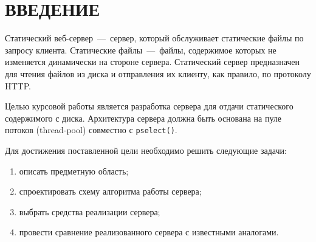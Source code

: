 \chapter*{ВВЕДЕНИЕ}

Статический веб-сервер~---~сервер, который обслуживает статические файлы по запросу клиента.
Статические файлы~---~файлы, содержимое которых не изменяется динамически на стороне сервера.
Статический сервер предназначен для чтения файлов из диска и отправления их клиенту, как правило, по протоколу HTTP.

Целью курсовой работы является разработка сервера для отдачи статического содержимого с диска.
Архитектура сервера должна быть основана на пуле потоков (thread-pool) совместно с \texttt{pselect()}.

Для достижения поставленной цели необходимо решить следующие задачи:
\begin{enumerate}
	\item описать предметную область;
	\item спроектировать схему алгоритма работы сервера;
	\item выбрать средства реализации сервера;
	\item провести сравнение реализованного сервера с известными аналогами.
\end{enumerate} 
